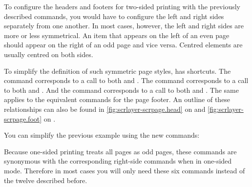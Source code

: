 \begin{Declaration}
\end{Declaration}
To configure the headers and footers for two-sided printing with the
previously described commands, you would have to configure the left and right
sides separately from one another. In most cases, however, the left and right
sides are more or less symmetrical. An item that appears on the left of an
even page should appear on the right of an odd page and vice versa. Centred
elements are usually centred on both sides.

To simplify the definition of such symmetric page styles,
 has shortcuts. The  command
corresponds to a call to both  and
. The  command corresponds to a
call to both  and
. And the  command corresponds to
a call to both  and
. The same applies to the equivalent commands
for the page footer. An outline of these relationships can also be found in
\autoref{fig:scrlayer-scrpage.head} on 
and \autoref{fig:scrlayer-scrpage.foot} on
.
%
\begin{Example}
  You can simplify the previous example using the new commands:
\iffalse%
  As you can see, you can use half the number of commands but get the same
  result. %
\fi%
\end{Example}%
Because one-sided printing treats all pages as odd pages, these commands are
synonymous with the corresponding right-side commands when in one-sided mode.
Therefore in most cases you will only need these six commands instead of the
twelve described before.

